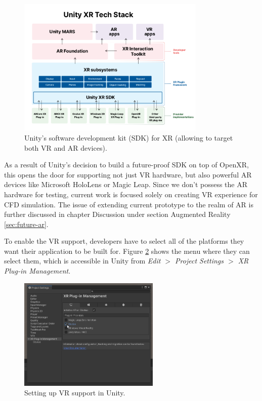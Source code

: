 \begin{figure}[!ht]
	\centering
	\includegraphics[width=0.8\textwidth]{figures/unity-xr-tech-stack.png}
	\caption{Unity's software development kit (SDK) for XR (allowing to target both VR and AR devices).}
	\label{fig:unity-xr-tech-stack}
\end{figure}

As a result of Unity's decision to build a future-proof SDK on top of OpenXR, this opens the door for supporting not just VR hardware, but also powerful AR devices like Microsoft HoloLens or Magic Leap. Since we don't possess the AR hardware for testing, current work is focused solely on creating VR experience for CFD simulation. The issue of extending current prototype to the realm of AR is further discussed in chapter Discussion under section Augmented Reality \ref{sec:future-ar}.

To enable the VR support, developers have to select all of the platforms they want their application to be built for. Figure \ref{fig:unity-vr-support} shows the menu where they can select them, which is accessible in Unity from \emph{Edit $>$ Project Settings $>$ XR Plug-in Management}.

\begin{figure}[!ht]
	\centering
	\includegraphics[width=0.6\textwidth]{figures/enable-xr-oculus.png}
	\caption{Setting up VR support in Unity.}
	\label{fig:unity-vr-support}
\end{figure}

